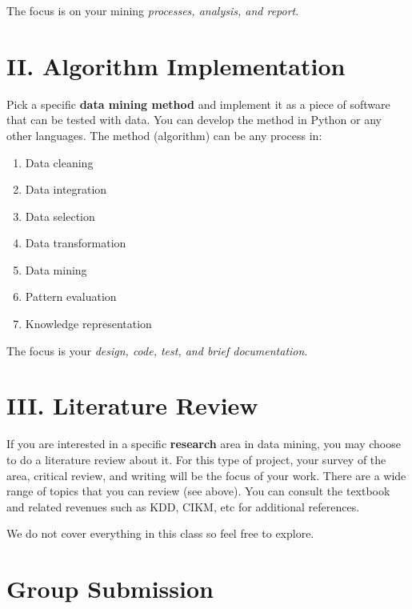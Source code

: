 \documentclass[
  letterpaper,
]{scrbook}
\providecommand{\tightlist}{%
  \setlength{\itemsep}{0pt}\setlength{\parskip}{0pt}}
\begin{document}
The focus is on your mining \emph{processes, analysis, and report}.

\section*{II. Algorithm
Implementation}\label{ii.-algorithm-implementation}


Pick a specific \textbf{data mining method} and implement it as a piece
of software that can be tested with data. You can develop the method in
Python or any other languages. The method (algorithm) can be any process
in:

\begin{enumerate}
\def\labelenumi{\arabic{enumi}.}
\tightlist
\item
  Data cleaning
\item
  Data integration
\item
  Data selection
\item
  Data transformation
\item
  Data mining
\item
  Pattern evaluation
\item
  Knowledge representation
\end{enumerate}

The focus is your \emph{design, code, test, and brief documentation}.

\section*{III. Literature Review}\label{iii.-literature-review}


If you are interested in a specific \textbf{research} area in data
mining, you may choose to do a literature review about it. For this type
of project, your survey of the area, critical review, and writing will
be the focus of your work. There are a wide range of topics that you can
review (see above). You can consult the textbook and related revenues
such as KDD, CIKM, etc for additional references.

We do not cover everything in this class so feel free to explore.

\section*{Group Submission}\label{group-submission}
\end{document}
